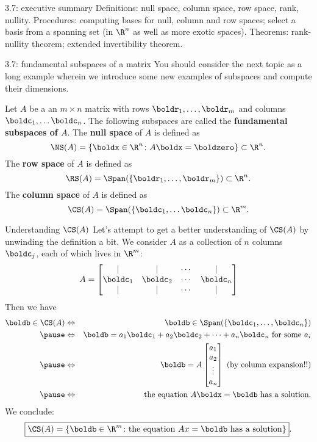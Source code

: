 \begin{frame}{3.7: executive summary}
\alert{Definitions:} null space, column space, row space, rank, nullity.
\bspace
\alert{Procedures:} computing bases for null, column and row spaces; select a basis from a spanning set (in $\R^n$ as well as more exotic spaces). 
\bspace
\alert{Theorems:} rank-nullity theorem; extended invertibility theorem.
\end{frame}
\begin{frame}{3.7: fundamental subspaces of a matrix}
You should consider the next topic as a long example wherein we introduce some new examples of subspaces and compute their dimensions. 
\begin{definition}
Let $A$ be a an $m\times n$ matrix with rows $\boldr_1,\dots, \boldr_m$ and columns $\boldc_1,\dots \boldc_n$. The following subspaces are called the {\bf fundamental subspaces of $A$}. 
\bb
\ii The {\bf null space} of $A$ is defined as 
\[
\NS(A)=\{\boldx\in\R^n\colon A\boldx=\boldzero\}\subset \R^n.
\]
\ii The {\bf row space} of $A$ is defined as 
\[
\RS(A)=\Span(\{\boldr_1,\dots, \boldr_m\})\subset\R^n.
\]
\ii The {\bf column space} of $A$ is defined as 
\[
\CS(A)=\Span(\{\boldc_1,\dots \boldc_n\})\subset\R^m. 
\]
\ee
\end{definition}
\end{frame}
\begin{frame}{Understanding $\CS(A)$}
Let's attempt to get a better understanding of $\CS(A)$ by unwinding the definition a bit. We consider $A$ as a collection of $n$ columns $\boldc_j$, each of which lives in $\R^m$:
\[
A=\begin{bmatrix}
\vert&\vert& \cdots &\vert\\
\boldc_1&\boldc_2&\cdots &\boldc_n\\
\vert&\vert& \cdots &\vert
\end{bmatrix}
\]
\pause
Then we have 
\begin{eqnarray*}
\boldb\in\CS(A)&\Leftrightarrow& \boldb\in\Span(\{\boldc_1,\dots,\boldc_n\})\\
\pause&\Leftrightarrow & \boldb=a_1\boldc_1+a_2\boldc_2+\cdots + a_n\boldc_n \text{ for some $a_i$}\\
\pause&\Leftrightarrow & \boldb=A\begin{bmatrix}
a_1\\ a_2\\ \vdots \\ a_n
\end{bmatrix} \text{ (by column expansion!!)} \\
\pause&\Leftrightarrow & \text{ the equation } A\boldx=\boldb \text{ has a solution}.
\end{eqnarray*}
We conclude:
\[
\boxed{\CS(A)=\{\boldb\in\R^m\colon \text{the equation }Ax=\boldb \text{ has a solution}\}}.
\]
\end{frame}

